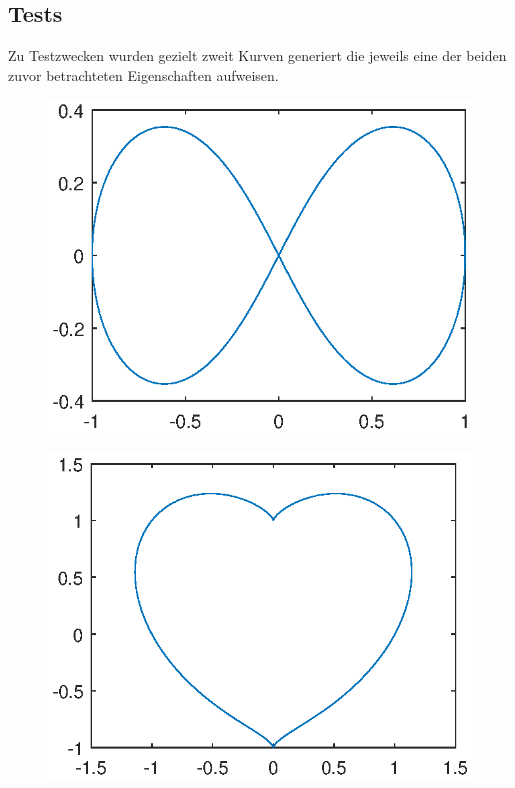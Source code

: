 \documentclass[a4paper,11pt,bibliography=totoc,listof=totoc,headinclude=true,cleardoublepage=empty,oneside]{scrartcl}
\begin{document}
\subsection{Tests}
Zu Testzwecken wurden gezielt zweit Kurven generiert die jeweils eine der beiden zuvor betrachteten Eigenschaften aufweisen.
\begin{figure}[H]
	\centering
	\begin{minipage}{.5\textwidth}
		\centering
		\includegraphics[width=1\linewidth]{plots/C/Lemniskate.eps}
		\label{fig:test1}
	\end{minipage}%
	\begin{minipage}{.5\textwidth}
		\centering
		\includegraphics[width=1\linewidth]{plots/C/Herz.eps}
		\label{fig:test2}
	\end{minipage}
\end{figure}
\end{document}
